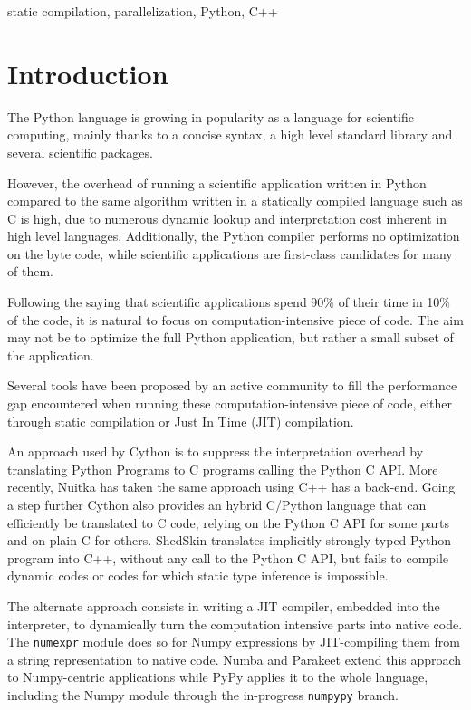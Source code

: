 \documentclass[10pt, onecolumn, preprint]{sigplanconf}
\begin{document}
\keywords
static compilation, parallelization, Python, C++


\section{Introduction}

The Python language is growing in popularity as a language for scientific
computing, mainly thanks to a concise syntax, a high level standard library and
several scientific packages.

However, the overhead of running a scientific application written in Python
compared to the same algorithm written in a statically compiled language such
as C is high, due to numerous dynamic lookup and interpretation cost inherent
in high level languages. Additionally, the Python compiler performs no
optimization on the byte code, while scientific applications are first-class
candidates for many of them.

Following the saying that scientific applications spend 90\% of their time in
10\% of the code, it is natural to focus on computation-intensive piece of code.
The aim may not be to optimize the full Python application, but rather a
small subset of the application.

Several tools have been proposed by an active community to fill the performance
gap encountered when running these computation-intensive piece of code, either
through static compilation or Just In Time (JIT) compilation.

An approach used by Cython\cite{cython2010} is to suppress the interpretation
overhead by translating Python Programs to C programs calling the Python C
API\cite{pythoncapi}. More recently, Nuitka\cite{nuitka}  has taken the same
approach using C++ has a back-end. Going a step further Cython also provides an
hybrid C/Python language that can efficiently be translated to C code, relying
on the Python C API for some parts and on plain C for others.
ShedSkin\cite{shedskin2006} translates implicitly strongly typed Python program
into C++, without any call to the Python C API, but fails to compile dynamic
codes or codes for which static type inference is impossible.

The alternate approach consists in writing a JIT compiler, embedded into the
interpreter, to dynamically turn the computation intensive parts into native
code. The \texttt{numexpr} module\cite{numexpr} does so for Numpy expressions
by JIT-compiling them from a string representation to native code.
Numba\cite{numba} and Parakeet\cite{parakeet2012} extend this approach to
Numpy-centric applications while PyPy\cite{pypy2009} applies it to the whole
language, including the Numpy module through the in-progress \texttt{numpypy}
branch.
\end{document}
